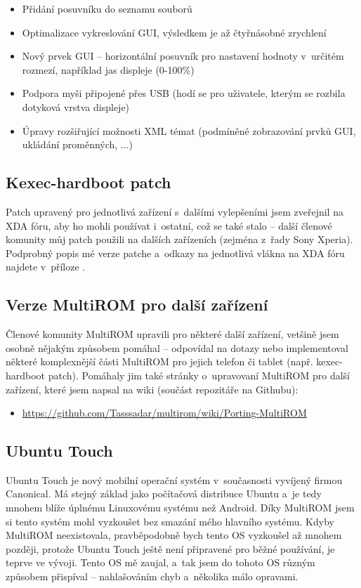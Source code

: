 \documentclass[12pt, a4paper, oneside]{article}
\begin{document}
\begin{itemize}
    \item Přidání posuvníku do seznamu souborů
    \item Optimalizace vykreslování GUI, výsledkem je až čtyřnásobné zrychlení
    \item Nový prvek GUI -- horizontální posuvník pro nastavení hodnoty v~určitém rozmezí, například jas displeje (0-100\%)
    \item Podpora myši připojené přes USB (hodí se pro uživatele, kterým se rozbila dotyková vrstva displeje)
    \item Úpravy rozšiřující možnosti XML témat (podmíněné zobrazování prvků GUI, ukládání proměnných, ...)
\end{itemize}

\subsection{Kexec-hardboot patch}
Patch upravený pro jednotlivá zařízení s~dalšími vylepšeními jsem zveřejnil na XDA fóru, aby ho mohli používat i~ostatní, což se také stalo -- další členové komunity můj patch použili na dalších zařízeních (zejména z~řady Sony Xperia). Podprobný popis mé verze patche a~odkazy na jednotlivá vlákna na XDA fóru najdete v~příloze .

\subsection{Verze MultiROM pro další zařízení}
Členové komunity MultiROM upravili pro některé další zařízení, vetšině jsem osobně nějakým způsobem pomáhal -- odpovídal na dotazy nebo implementoval některé komplexnější části MultiROM pro jejich telefon či tablet (např. kexec-hardboot patch). Pomáhaly jim také stránky o~upravovaní MultiROM pro další zařízení, které jsem napsal na wiki (součást repozitáře na Githubu):

\begin{itemize}
    \item \url{https://github.com/Tasssadar/multirom/wiki/Porting-MultiROM}
\end{itemize}

\subsection{Ubuntu Touch}
Ubuntu Touch\cite{utouch} je nový mobilní operační systém v~současnosti vyvíjený firmou Canonical. Má stejný základ jako počítačová distribuce Ubuntu a~je tedy mnohem blíže úplnému Linuxovému systému než Android. Díky MultiROM jsem si tento systém mohl vyzkoušet bez smazání mého hlavního systému. Kdyby MultiROM neexistovala, pravběpodobně bych tento OS vyzkoušel až mnohem později, protože Ubuntu Touch ještě není připravené pro běžné používání, je teprve ve vývoji. Tento OS mě zaujal, a~tak jsem do tohoto OS různým způsobem přispíval -- nahlašováním chyb a~několika málo opravami.
\end{document}
